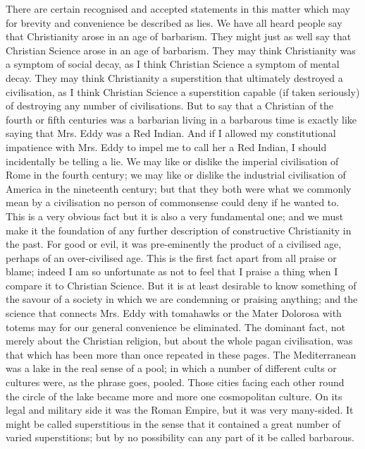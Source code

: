 There are certain recognised and accepted statements in this matter which may for brevity and convenience be described as lies. We have all heard people say that Christianity arose in an age of barbarism. They might just as well say that Christian Science arose in an age of barbarism. They may think Christianity was a symptom of social decay, as I think Christian Science a symptom of mental decay. They may think Christianity a superstition that ultimately destroyed a civilisation, as I think Christian Science a superstition capable (if taken seriously) of destroying any number of civilisations. But to say that a Christian of the fourth or fifth centuries was a barbarian living in a barbarous time is exactly like saying that Mrs. Eddy was a Red Indian. And if I allowed my constitutional impatience with Mrs. Eddy to impel me to call her a Red Indian, I should incidentally be telling a lie. We may like or dislike the imperial civilisation of Rome in the fourth century; we may like or dislike the industrial civilisation of America in the nineteenth century; but that they both were what we commonly mean by a civilisation no person of commonsense could deny if he wanted to. This is a very obvious fact but it is also a very fundamental one; and we must make it the foundation of any further description of constructive Christianity in the past. For good or evil, it was pre-eminently the product of a civilised age, perhaps of an over-civilised age. This is the first fact apart from all praise or blame; indeed I am so unfortunate as not to feel that I praise a thing when I compare it to Christian Science. But it is at least desirable to know something of the savour of a society in which we are condemning or praising anything; and the science that connects Mrs. Eddy with tomahawks or the Mater Dolorosa with totems may for our general convenience be eliminated. The dominant fact, not merely about the Christian religion, but about the whole pagan civilisation, was that which has been more than once repeated in these pages. The Mediterranean was a lake in the real sense of a pool; in which a number of different cults or cultures were, as the phrase goes, pooled. Those cities facing each other round the circle of the lake became more and more one cosmopolitan culture. On its legal and military side it was the Roman Empire, but it was very many-sided. It might be called superstitious in the sense that it contained a great number of varied superstitions; but by no possibility can any part of it be called barbarous.


